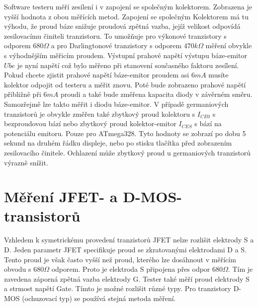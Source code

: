 Software testeru měří zesílení i v zapojení se společným kolektorem.
Zobrazena je vyšší hodnota z obou měřících metod.
Zapojení se společným Kolektorem má tu výhodu, že proud báze snižuje proudová zpětná vazba,
jejíž velikost odpovídá zesilovacímu činiteli tranzistoru.
To umožňuje pro výkonové tranzistory s odporem \(680\Omega\) a pro Darlingtonové
tranzistory s odporem \(470k\Omega\) měření obvykle s výhodnějším měřicím proudem.
Výstupní prahové napětí výstupu báze-emitor \(Ube\) je nyní napětí což bylo měřeno při
stanovení současného faktoru zesílení.
Pokud chcete zjistit prahové napětí báze-emitor proudem asi \(6mA\) musíte kolektor
odpojit od testeru a měřit znovu.
Poté bude zobrazeno prahové napětí přibližně při \(6mA\) proudi a také bude změřena
kapacita diody v závěrném směru.
Samozřejmě lze takto měřit i diodu báze-emitor.
V případě germaniových tranzistorů je obvykle změřen také zbytkový proud kolektoru s \(I_{CE0}\) s
bezproudovou bází nebo zbytkový proud kolektor-emitor \(I_{CES}\) s bází na potenciálu emitoru.
Pouze pro ATmega328.
Tyto hodnoty se zobrazí po dobu 5 sekund na druhém řádku displeje,
nebo po stisku tlačítka před zobrazením zesilovacího činitele.
Ochlazení může zbytkový proud u germaniových tranzistorů výrazně snížit. 

\section{Měření JFET- a D-MOS- transistorů}
Vzhledem k symetrickému provedení tranzistorů JFET nelze rozlišit elektrody S a D.
Jeden parametr JFET specifikuje proud se zkratovanými elektrodami D a S.
Tento proud je však často vyšší než proud, kterého lze dosáhnout v měřícím obvodu s \(680\Omega\) odporem.
Proto je elektroda S připojena přes odpor \(680\Omega\).
Tím je zavedena záporná zpětná vazba elektrody G.
Tester také měří proud elektrody S a strmost napětí Gate.
Tímto je možné rozlišit různé typy.
Pro tranzistory D-MOS (ochuzovací typ) se používá stejná metoda měření.

